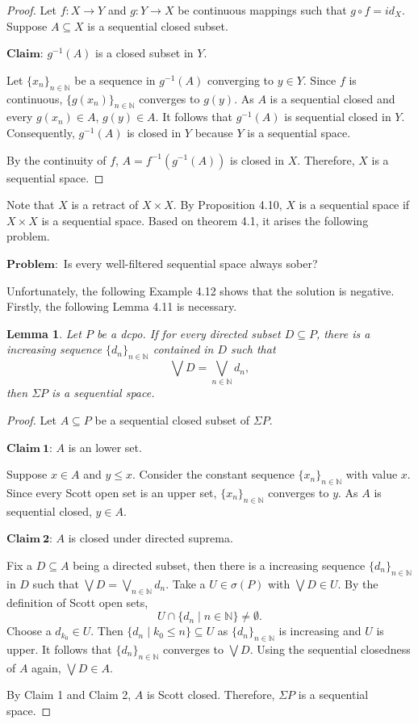 \documentclass[preprint,12pt]{elsarticle}
\numberwithin{equation}{section}
\newtheorem{lemma}[theorem]{Lemma}
\begin{document}
\begin{proof} Let $f:X\longrightarrow Y$ and $g:Y\longrightarrow X$ be continuous mappings such that $g\circ f=id_{X}$. Suppose $A\subseteq X$ is a sequential closed subset.

$\mathbf{Claim}$: $g^{-1}(A)$ is a closed subset in $Y$.

Let $\{x_{n}\}_{n\in\mathbb{N}}$ be a sequence in $g^{-1}(A)$ converging to $y\in Y$. Since $f$ is continuous, $\{g(x_{n})\}_{n\in\mathbb{N}}$ converges to $g(y)$. As $A$ is a sequential closed and every $g(x_{n})\in A$, $g(y)\in A$. It follows that $g^{-1}(A)$ is sequential closed in $Y$. Consequently, $g^{-1}(A)$ is closed in $Y$ because $Y$ is a sequential space.

By the continuity of $f$, $A=f^{-1}(g^{-1}(A))$ is closed in $X$. Therefore, $X$ is a sequential space.
\end{proof}


Note that $X$ is a retract of $X\times X$. By Proposition 4.10, $X$ is a sequential space if $X\times X$ is a sequential space. Based on theorem 4.1, it arises the following problem.

\vspace*{0.2cm}
$\mathbf{Problem:}$ Is every well-filtered sequential space always sober?
\vspace*{0.2cm}

Unfortunately, the following Example 4.12 shows that the solution is negative. Firstly, the following Lemma 4.11 is necessary.

\begin{lemma} {\rm Let $P$ be a dcpo. If for every directed subset $D\subseteq P$, there is a increasing sequence $\{d_{n}\}_{n\in\mathbb{N}}$ contained in $D$ such that $$\bigvee D=\bigvee\limits_{n\in\mathbb{N}}d_{n},$$ then $\Sigma P$ is a sequential space.}
\end{lemma}

\begin{proof} Let $A\subseteq P$ be a sequential closed subset of $\Sigma P$.

$\mathbf{Claim\ 1}$: $A$ is an lower set.

Suppose $x\in A$ and $y\leq x$. Consider the constant sequence $\{x_n\}_{n\in\mathbb{N}}$ with value $x$. Since every Scott open set is an upper set, $\{x_n\}_{n\in\mathbb{N}}$ converges to $y$. As $A$ is sequential closed, $y\in A$.

$\mathbf{Claim\ 2}$: $A$ is closed under directed suprema.

Fix a $D\subseteq A$ being a directed subset, then there is a increasing sequence $\{d_{n}\}_{n\in\mathbb{N}}$ in $D$ such that $\bigvee D=\bigvee\limits_{n\in\mathbb{N}}d_{n}$. Take a $U\in\sigma(P)$ with $\bigvee D\in U$. By the definition of Scott open sets, $$U\cap\{d_{n}\mid n\in\mathbb{N}\}\neq\emptyset.$$ Choose a $d_{k_{0}}\in U$. Then $\{d_{n}\mid k_{0}\leq n\}\subseteq U$ as $\{d_{n}\}_{n\in\mathbb{N}}$ is increasing and $U$ is upper. It follows that $\{d_{n}\}_{n\in\mathbb{N}}$ converges to $\bigvee D$. Using the sequential closedness of $A$ again, $\bigvee D\in A$.

By Claim 1 and Claim 2, $A$ is Scott closed. Therefore, $\Sigma P$ is a sequential space.\end{proof}
\end{document}
